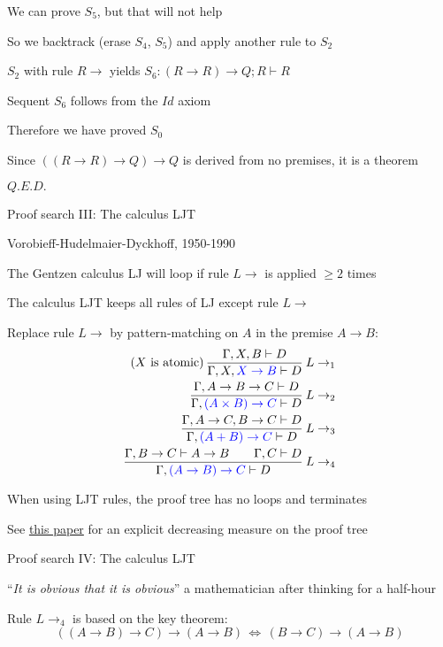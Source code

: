 We can prove $S_{5}$, but that will not help

So we backtrack (erase $S_{4}$, $S_{5}$) and apply another rule
to $S_{2}$

$S_{2}$ with rule $R\rightarrow$ yields $S_{6}:\left(R\rightarrow R\right)\rightarrow Q;R\vdash R$

Sequent $S_{6}$ follows from the $Id$ axiom

Therefore we have proved $S_{0}$

Since $\left(\left(R\rightarrow R\right)\rightarrow Q\right)\rightarrow Q$
is derived from no premises, it is a theorem

$Q.E.D.$

Proof search III: The calculus LJT

Vorobieff-Hudelmaier-Dyckhoff, 1950-1990

The Gentzen calculus LJ will loop if rule $L\rightarrow$ is applied
$\geq2$ times

The calculus LJT keeps all rules of LJ except rule $L\rightarrow$

Replace rule $L\rightarrow$ by pattern-matching on $A$ in the premise
$A\rightarrow B$:
\begin{align*}
\text{(}X\text{ is atomic)\,}\frac{\Gamma,X,B\vdash D}{\Gamma,X,{\color{blue}X\rightarrow B}\vdash D}\:L\rightarrow_{1}\\
\frac{\Gamma,A\rightarrow B\rightarrow C\vdash D}{\Gamma,{\color{blue}(A\times B)\rightarrow C}\vdash D}\:L\rightarrow_{2}\\
\frac{\Gamma,A\rightarrow C,B\rightarrow C\vdash D}{\Gamma,{\color{blue}(A+B)\rightarrow C}\vdash D}\:L\rightarrow_{3}\\
\frac{\Gamma,B\rightarrow C\vdash A\rightarrow B\quad\quad\Gamma,C\vdash D}{\Gamma,{\color{blue}(A\rightarrow B)\rightarrow C}\vdash D}\:L\rightarrow_{4}
\end{align*}

When using LJT rules, the proof tree has no loops and terminates

See \href{http://citeseer.ist.psu.edu/viewdoc/summary?doi=10.1.1.35.2618}{this paper}
for an explicit decreasing measure on the proof tree

Proof search IV: The calculus LJT

\textsf{``}\emph{It is obvious that it is obvious}\textsf{''} \textemdash{} a mathematician
after thinking for a half-hour

Rule $L\rightarrow_{4}$ is based on the key theorem: {\footnotesize{}
\[
\left(\left(A\rightarrow B\right)\rightarrow C\right)\rightarrow\left(A\rightarrow B\right)\,\Longleftrightarrow\,\left(B\rightarrow C\right)\rightarrow\left(A\rightarrow B\right)
\]
}{\footnotesize\par}

